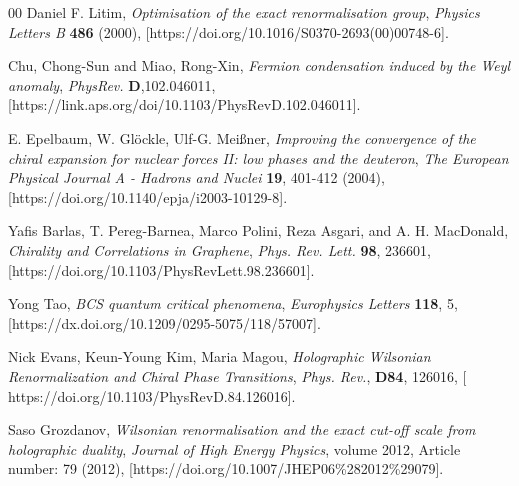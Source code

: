 \documentclass[twoside]{article}
\begin{document}
\begin{thebibliography}{00}
Daniel F. Litim, {\it {Optimisation of the exact renormalisation group}}, {\em Physics Letters B} {\bf 486} (2000), [{https://doi.org/10.1016/S0370-2693(00)00748-6}].

Chu, Chong-Sun and Miao, Rong-Xin, {\it {Fermion condensation induced by the Weyl anomaly}}, {\em PhysRev.} {\bf D},102.046011, [{https://link.aps.org/doi/10.1103/PhysRevD.102.046011}].

E. Epelbaum, W. Glöckle, Ulf-G. Meißner, {\it {Improving the convergence of the chiral expansion for nuclear forces II: low phases and the deuteron}}, {\em The European Physical Journal A - Hadrons and Nuclei} {\bf 19}, 401-412 (2004), [{https://doi.org/10.1140/epja/i2003-10129-8}].

Yafis Barlas, T. Pereg-Barnea, Marco Polini, Reza Asgari, and A. H. MacDonald, {\it {Chirality and Correlations in Graphene}}, {\em Phys. Rev. Lett.} {\bf 98}, 236601, [{https://doi.org/10.1103/PhysRevLett.98.236601}].

Yong Tao, {\it {BCS quantum critical phenomena}}, {\em Europhysics Letters} {\bf 118}, 5, [{https://dx.doi.org/10.1209/0295-5075/118/57007}].

Nick Evans, Keun-Young Kim, Maria Magou, {\it {Holographic Wilsonian Renormalization and Chiral Phase Transitions}}, {\em Phys. Rev.}, {\bf D84}, 126016, [{
https://doi.org/10.1103/PhysRevD.84.126016}].

Saso Grozdanov, {\it {Wilsonian renormalisation and the exact cut-off scale from holographic duality}}, {\em Journal of High Energy Physics}, volume 2012, Article number: 79 (2012), 
[{https://doi.org/10.1007/JHEP06\%282012\%29079}].



 
\end{thebibliography}
\end{document}
